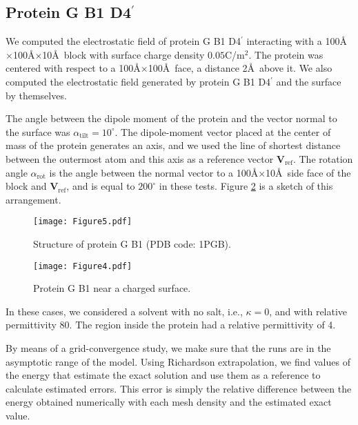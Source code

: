 \subsection{Protein G B1 D4$^{\prime}$} \label{sec:PGB}

We computed the electrostatic field of protein G B1 D4$^{\prime}$ interacting with a 100\AA$\times$100\AA$\times$10\AA\ block with surface charge density $0.05$C/m$^2$. The protein was centered with respect to a  100\AA$\times$100\AA\ face, a distance 2\AA\ above it. We also computed the electrostatic field generated by protein G B1 D4$^\prime$ and the surface by themselves.

The angle between the dipole moment of the protein and the vector normal to the surface was $\alpha_\text{tilt}=10^\circ$. The dipole-moment vector placed at the center of mass of the protein generates an axis, and we used the line of shortest distance between the outermost atom and this axis as a reference vector $\mathbf{V}_{\text{ref}}$. The rotation angle $\alpha_{\text{rot}}$ is the angle between the normal vector to a 100\AA$\times$10\AA\ side face of the block and $\mathbf{V}_{\text{ref}}$, and is equal to $200^\circ$ in these tests. Figure \ref{fig:protein_surface} is a sketch of this arrangement.

\begin{figure}[h] %
   \centering
   \texttt{[image: Figure5.pdf]} 
   \caption{Structure of protein G B1 (PDB code: 1PGB).}
   \label{fig:1PGB}
\end{figure}

\begin{figure}[h] %
   \centering
   \texttt{[image: Figure4.pdf]} 
   \caption{Protein G B1 near a charged surface.}
   \label{fig:protein_surface}
\end{figure}

In these cases, we considered a solvent with no salt, i.e., $\kappa=0$, and with relative permittivity 80. The region inside the protein had a relative permittivity of 4.

By means of a grid-convergence study, we make sure that the runs are in the asymptotic range of the model. Using Richardson extrapolation, we find values of the energy that estimate the exact solution and use them as a reference to calculate estimated errors. This error is simply the relative difference between the energy obtained numerically with each mesh density and the estimated exact value. 

